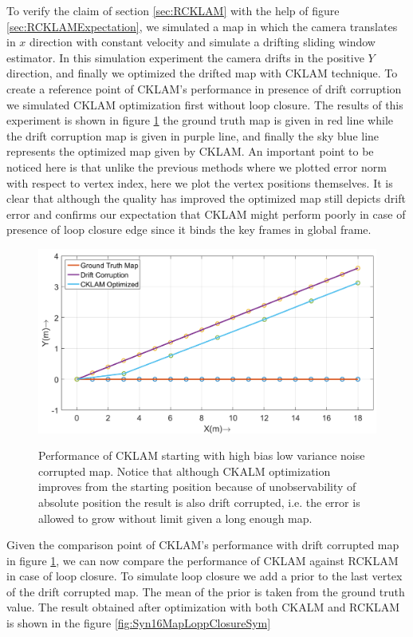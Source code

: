   To verify the claim of section \ref{sec:RCKLAM} with the help of figure \ref{sec:RCKLAMExpectation}, we simulated a map in which the camera translates in $x$ direction with constant velocity and simulate a drifting sliding window estimator. In this simulation experiment the camera drifts in the positive $Y$ direction, and finally we optimized the drifted map with CKLAM technique. To create a reference point of CKLAM's performance in presence of drift corruption we simulated CKLAM optimization first without loop closure. The results of this experiment is shown in figure \ref{fig:Syn16MapCklam} the ground truth map is given in red line while the drift corruption map is given in purple line, and finally the sky blue line represents the optimized map given by CKLAM. An important point to be noticed here is that unlike the previous methods where we plotted error norm with respect to vertex index, here we plot the vertex positions themselves. It is clear that although the quality has improved the optimized map still depicts drift error and confirms our expectation that CKLAM might perform poorly in case of presence of loop closure edge since it binds the key frames in global frame.
  
\begin{figure}
  \centering
    \includegraphics[width=1.00\textwidth]{images/Syn16_map_cklam.png}
  \label{fig:Syn16MapCklam}
  \caption{Performance of CKLAM starting with high bias low variance noise corrupted map. Notice that although CKALM optimization improves from the starting position because of unobservability of absolute position the result is also drift corrupted, i.e. the error is allowed to grow without limit given a long enough map.}
\end{figure}
  
  Given the comparison point of CKLAM's performance with drift corrupted map in figure \ref{fig:Syn16MapCklam}, we can now compare the performance of CKLAM against RCKLAM in case of loop closure. To simulate loop closure we add a prior to the last vertex of the drift corrupted map. The mean of the prior is taken from the ground truth value. The result obtained after optimization with both CKALM and RCKLAM is shown in the figure \ref{fig:Syn16MapLoppClosureSym}
  
